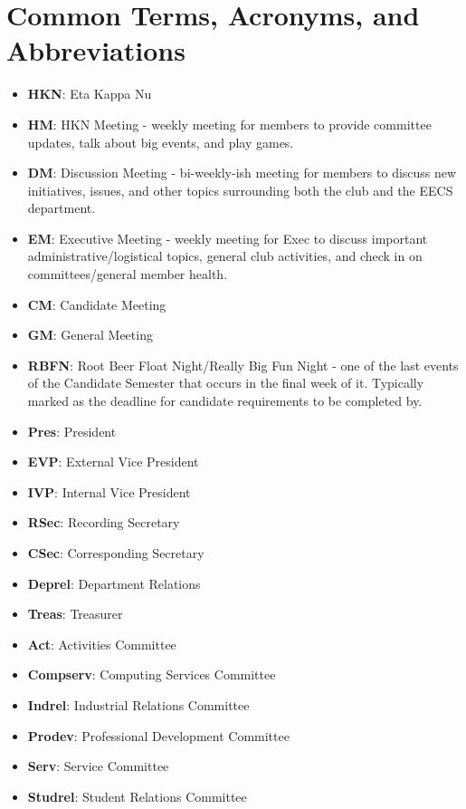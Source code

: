 \documentclass[11pt, article, oneside]{memoir}
\begin{document}
    \chapter{Common Terms, Acronyms, and Abbreviations}
    \begin{itemize}
        \item \textbf{HKN}: Eta Kappa Nu
        \item \textbf{HM}: HKN Meeting - weekly meeting for members to provide committee updates, talk about big events, and play games.
        \item \textbf{DM}: Discussion Meeting - bi-weekly-ish meeting for members to discuss new initiatives, issues, and other topics surrounding both the club and the EECS department.
        \item \textbf{EM}: Executive Meeting - weekly meeting for Exec to discuss important administrative/logistical topics, general club activities, and check in on committees/general member health.
        \item \textbf{CM}: Candidate Meeting
        \item \textbf{GM}: General Meeting
        \item \textbf{RBFN}: Root Beer Float Night/Really Big Fun Night - one of the last events of the Candidate Semester that occurs in the final week of it. Typically marked as the deadline for candidate requirements to be completed by.
        \item \textbf{Pres}: President
        \item \textbf{EVP}: External Vice President
        \item \textbf{IVP}: Internal Vice President
        \item \textbf{RSec}: Recording Secretary
        \item \textbf{CSec}: Corresponding Secretary
        \item \textbf{Deprel}: Department Relations
        \item \textbf{Treas}: Treasurer
        \item \textbf{Act}: Activities Committee
        \item \textbf{Compserv}: Computing Services Committee
        \item \textbf{Indrel}: Industrial Relations Committee
        \item \textbf{Prodev}: Professional Development Committee
        \item \textbf{Serv}: Service Committee
        \item \textbf{Studrel}: Student Relations Committee
    \end{itemize}
    
\end{document}
